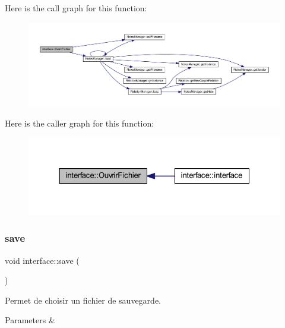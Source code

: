 Here is the call graph for this function\+:\nopagebreak
\begin{figure}[H]
\begin{center}
\leavevmode
\includegraphics[width=350pt]{classinterface_af42d8f6426ad19ce13f1dd2ce9f519c1_cgraph}
\end{center}
\end{figure}
Here is the caller graph for this function\+:\nopagebreak
\begin{figure}[H]
\begin{center}
\leavevmode
\includegraphics[width=325pt]{classinterface_af42d8f6426ad19ce13f1dd2ce9f519c1_icgraph}
\end{center}
\end{figure}
\mbox{\label{classinterface_a319f133949e2be97a203f725c3f1e565}} 
\subsubsection{\texorpdfstring{save}{save}}
{\footnotesize\ttfamily void interface\+::save (\begin{DoxyParamCaption}{ }\end{DoxyParamCaption})\hspace{0.3cm}{\ttfamily [slot]}}



Permet de choisir un fichier de sauvegarde. 


\begin{DoxyParams}{Parameters}
{\em } & \\
\hline
\end{DoxyParams}


